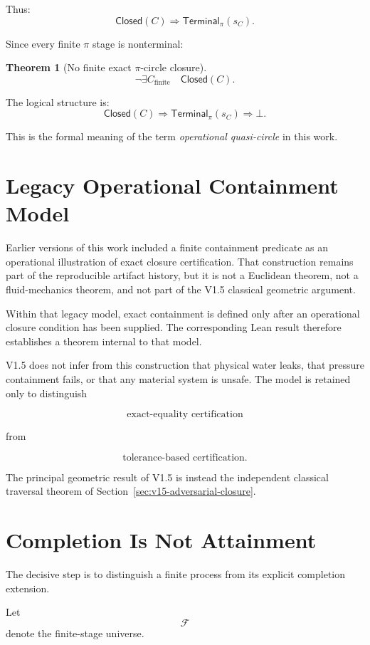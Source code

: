 \documentclass[11pt,a4paper]{article}
\newtheorem{theorem}{Theorem}
\newcommand{\Closed}{\mathsf{Closed}}
\newcommand{\Terminal}{\mathsf{Terminal}}
\newcommand{\False}{\bot}
\begin{document}
Thus:
\[
\Closed(C)
\Longrightarrow
\Terminal_\pi(s_C).
\]

Since every finite $\pi$ stage is nonterminal:

\begin{theorem}[No finite exact $\pi$-circle closure]
\[
\boxed{
\neg\exists C_{\mathrm{finite}}
\quad
\Closed(C).
}
\]
\end{theorem}

The logical structure is:
\[
\Closed(C)
\Rightarrow
\Terminal_\pi(s_C)
\Rightarrow
\False.
\]

This is the formal meaning of the term
\emph{operational quasi-circle} in this work.


\section{Legacy Operational Containment Model}

Earlier versions of this work included a finite containment predicate
as an operational illustration of exact closure certification.  That
construction remains part of the reproducible artifact history, but it
is not a Euclidean theorem, not a fluid-mechanics theorem, and not part
of the V1.5 classical geometric argument.

Within that legacy model, exact containment is defined only after an
operational closure condition has been supplied.  The corresponding
Lean result therefore establishes a theorem internal to that model.

V1.5 does not infer from this construction that physical water leaks,
that pressure containment fails, or that any material system is unsafe.
The model is retained only to distinguish

\[
\text{exact-equality certification}
\]

from

\[
\text{tolerance-based certification}.
\]

The principal geometric result of V1.5 is instead the independent
classical traversal theorem of
Section~\ref{sec:v15-adversarial-closure}.


\section{Completion Is Not Attainment}

The decisive step is to distinguish a finite process from its explicit
completion extension.

Let
\[
\mathcal F
\]
denote the finite-stage universe.
\end{document}
